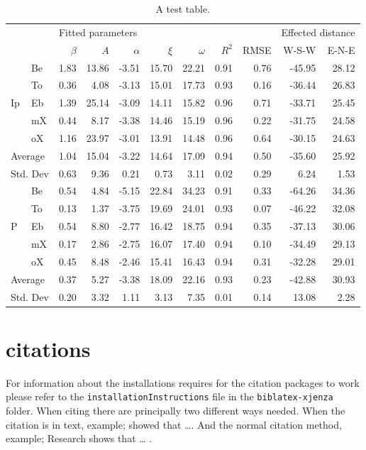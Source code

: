 \begin{table}[h!]
\centering
\small
\caption{A test table.}
\begin{tabular}{llrrrrrrrrr}
\toprule
& & \multicolumn{5}{l}{Fitted parameters} & &  & \multicolumn{ 2}{l}{Effected distance} \\ \cmidrule(r){3-7} \cmidrule(r){10-11}
 & & $\beta$ & $A$ & $\alpha$ & $\xi$ & $\omega$ & $R^2$ & RMSE & W-S-W & E-N-E \\ \midrule
\multirow{5}{*}{Ip} & Be & 1.83 & 13.86 & -3.51 & 15.70 & 22.21 & 0.91 & 0.76 & -45.95 & 28.12 \\ 
 & To & 0.36 & 4.08 & -3.13 & 15.01 & 17.73 & 0.93 & 0.16 & -36.44 & 26.83 \\ 
 & Eb & 1.39 & 25.14 & -3.09 & 14.11 & 15.82 & 0.96 & 0.71 & -33.71 & 25.45 \\ 
 & mX & 0.44 & 8.17 & -3.38 & 14.46 & 15.19 & 0.96 & 0.22 & -31.75 & 24.58 \\ 
 & oX & 1.16 & 23.97 & -3.01 & 13.91 & 14.48 & 0.96 & 0.64 & -30.15 & 24.63 \\ \midrule
\multicolumn{2}{l}{Average} & 1.04 & 15.04 & -3.22 & 14.64 & 17.09 & 0.94 & 0.50 & -35.60 & 25.92 \\ 
\multicolumn{2}{l}{Std. Dev} & 0.63 & 9.36 & 0.21 & 0.73 & 3.11 & 0.02 & 0.29 & 6.24 & 1.53 \\ \cmidrule[\heavyrulewidth]{1-11}
\multirow{5}{*}{P} & Be & 0.54 & 4.84 & -5.15 & 22.84 & 34.23 & 0.91 & 0.33 & -64.26 & 34.36 \\ 
 & To & 0.13 & 1.37 & -3.75 & 19.69 & 24.01 & 0.93 & 0.07 & -46.22 & 32.08 \\ 
 & Eb & 0.54 & 8.80 & -2.77 & 16.42 & 18.75 & 0.94 & 0.35 & -37.13 & 30.06 \\ 
 & mX & 0.17 & 2.86 & -2.75 & 16.07 & 17.40 & 0.94 & 0.10 & -34.49 & 29.13 \\ 
 & oX & 0.45 & 8.48 & -2.46 & 15.41 & 16.43 & 0.94 & 0.31 & -32.28 & 29.01 \\ \midrule
\multicolumn{2}{l}{Average}  & 0.37 & 5.27 & -3.38 & 18.09 & 22.16 & 0.93 & 0.23 & -42.88 & 30.93 \\ 
\multicolumn{2}{l}{Std. Dev} & 0.20 & 3.32 & 1.11 & 3.13 & 7.35 & 0.01 & 0.14 & 13.08 & 2.28 \\ \bottomrule
\end{tabular}
\label{tab:ex}
\end{table}

\section{citations}

For information about the installations requires for the citation packages to work please refer to the \texttt{installationInstructions} file in the \texttt{biblatex-xjenza} folder. When citing there are principally two different ways needed. When the citation is in text, example; \textcite{TestKey} showed that \dots{}. And the normal citation method, example; Research shows that \dots{} \cite{TestKey}.

\printbibliography


